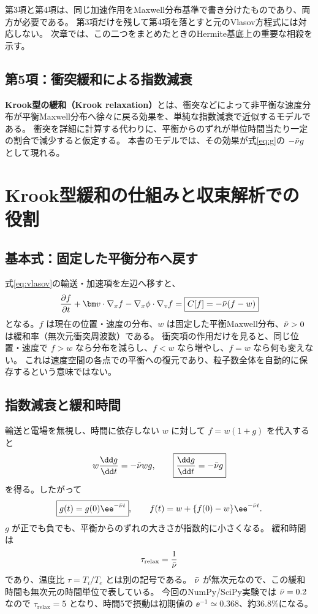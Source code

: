 第3項と第4項は、同じ加速作用をMaxwell分布基準で書き分けたものであり、両方が必要である。
第3項だけを残して第4項を落とすと元のVlasov方程式には対応しない。
次章では、この二つをまとめたときのHermite基底上の重要な相殺を示す。

\subsection{第5項：衝突緩和による指数減衰}
\textbf{Krook型の緩和（Krook relaxation）}とは、衝突などによって非平衡な速度分布が平衡Maxwell分布へ徐々に戻る効果を、単純な指数減衰で近似するモデルである。
衝突を詳細に計算する代わりに、平衡からのずれが単位時間当たり一定の割合で減少すると仮定する。
本書のモデルでは、その効果が式\eqref{eq:g}の $-\bar\nu g$ として現れる。

\section{Krook型緩和の仕組みと収束解析での役割}
\subsection{基本式：固定した平衡分布へ戻す}
式\eqref{eq:vlasov}の輸送・加速項を左辺へ移すと、
\[
\frac{\partial f}{\partial t}+\bm v\cdot\nabla_x f
-\nabla_x\phi\cdot\nabla_v f
=\boxed{C[f]=-\nuu(f-w)}
\]
となる。$f$ は現在の位置・速度の分布、$w$ は固定した平衡Maxwell分布、$\bar\nu>0$ は緩和率（無次元衝突周波数）である。
衝突項の作用だけを見ると、同じ位置・速度で $f>w$ なら分布を減らし、$f<w$ なら増やし、$f=w$ なら何も変えない。
これは速度空間の各点での平衡への復元であり、粒子数全体を自動的に保存するという意味ではない。

\subsection{指数減衰と緩和時間}
輸送と電場を無視し、時間に依存しない $w$ に対して $f=w(1+g)$ を代入すると
\[
w\frac{\dd g}{\dd t}=-\nuu w g,\qquad
\boxed{\frac{\dd g}{\dd t}=-\nuu g}
\]
を得る。したがって
\[
\boxed{g(t)=g(0)\ee^{-\nuu t}},\qquad
f(t)=w+\{f(0)-w\}\ee^{-\nuu t}.
\]
$g$ が正でも負でも、平衡からのずれの大きさが指数的に小さくなる。
緩和時間は
\[
\tau_{\mathrm{relax}}=\frac{1}{\bar\nu}
\]
であり、温度比 $\tau=T_i/T_e$ とは別の記号である。
$\bar\nu$ が無次元なので、この緩和時間も無次元の時間単位で表している。
今回のNumPy/SciPy実験では $\bar\nu=0.2$ なので $\tau_{\mathrm{relax}}=5$ となり、時間5で摂動は初期値の $\ee^{-1}\simeq0.368$、約36.8\%になる。

